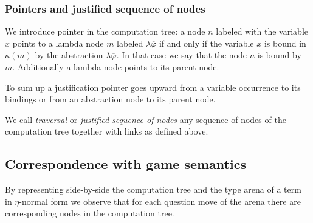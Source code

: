 \subsubsection{Pointers and justified sequence of nodes}

We introduce pointer in the computation tree: a node $n$ labeled
with the variable $x$ points to a lambda node $m$ labeled $\lambda
\overline{\varphi}$ if and only if the variable $x$ is bound in
$\kappa(m)$ by the abstraction $\lambda \overline{\varphi}$. In that
case we say that the node $n$ is bound by $m$. Additionally a lambda node points to its parent node.

To sum up a justification pointer goes upward from a variable occurrence to its bindings or from an abstraction node to its parent node.


We call \emph{traversal} or \emph{justified sequence of nodes} any sequence of nodes of the computation tree together
with links as defined above. 

\subsection{Correspondence with game semantics}

By representing side-by-side the computation tree and the type arena of a term in $\eta$-normal form we observe
that for each question move of the arena there are corresponding nodes in the computation tree.

